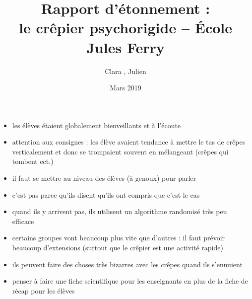 \documentclass[a4paper,11pt]{article}
\begin{document}
\title{Rapport d'étonnement : \\le crêpier psychorigide -- École Jules Ferry}
\author{Clara , Julien }
\date{Mars 2019}

\maketitle

\begin{itemize}
	\item les élèves étaient globalement bienveillants et à l'écoute
	\item attention aux consignes : les élève avaient tendance à mettre le tas de crêpes verticalement et donc se trompaient souvent en mélangeant (crêpes qui tombent ect.)
	\item il faut se mettre au niveau des élèves (à genoux) pour parler
	\item c'est pas parce qu'ils disent qu'ils ont compris que c'est le cas
	\item quand ils y arrivent pas, ils utilisent un algorithme randomisé très peu efficace
	\item certains groupes vont beaucoup plus vite que d'autres : il faut prévoir beaucoup d'extensions (surtout que le crêpier est une activité rapide)
	\item ils peuvent faire des choses très bizarres avec les crêpes quand ils s'ennuient 
	\item penser à faire une fiche scientifique pour les enseignants en plus de la fiche de récap pour les élèves
\end{itemize}
\end{document}
